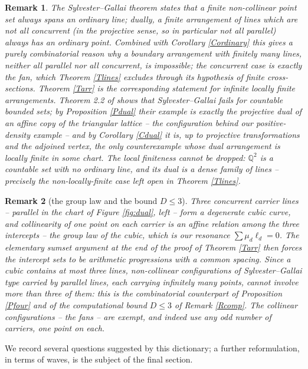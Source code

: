 \documentclass{article}
\newtheorem{remark}{Remark}
\begin{document}
	\begin{remark}
		The Sylvester--Gallai theorem states that a \emph{finite} non-collinear point set always spans an ordinary line; dually, a finite arrangement of lines which are not all concurrent (in the projective sense, so in particular not all parallel) always has an ordinary point. Combined with Corollary \ref{Cordinary} this gives a purely combinatorial reason why a boundary arrangement with finitely many lines, neither all parallel nor all concurrent, is impossible; the concurrent case is exactly the fan, which Theorem \ref{Tlines} excludes through its hypothesis of finite cross-sections. Theorem \ref{Tarr} is the corresponding statement for infinite locally finite arrangements. Theorem 2.2 of \cite{BDSYZ} shows that Sylvester--Gallai fails for countable \emph{bounded} sets; by Proposition \ref{Pdual} their example is exactly the projective dual of an affine copy of the triangular lattice -- the configuration behind our positive-density example -- and by Corollary \ref{Cdual} it is, up to projective transformations and the adjoined vertex, the only counterexample whose dual arrangement is locally finite in some chart. The local finiteness cannot be dropped: $\mathbb Q^2$ is a countable set with no ordinary line, and its dual is a dense family of lines -- precisely the non-locally-finite case left open in Theorem \ref{Tlines}.
	\end{remark}

	\begin{remark}[the group law and the bound $D\leq 3$]
		Three concurrent carrier lines -- parallel in the chart of Figure \ref{fig:dual}, left -- form a degenerate cubic curve, and collinearity of one point on each carrier is an affine relation among the three intercepts -- the group law of the cubic, which is our resonance $\sum\mu_d\ell_d=0$. The elementary sumset argument at the end of the proof of Theorem \ref{Tarr} then forces the intercept sets to be arithmetic progressions with a common spacing. Since a cubic contains at most three lines, non-collinear configurations of Sylvester--Gallai type carried by parallel lines, each carrying infinitely many points, cannot involve more than three of them: this is the combinatorial counterpart of Proposition \ref{Pfour} and of the computational bound $D\leq 3$ of Remark \ref{Rcomp}. The collinear configurations -- the fans -- are exempt, and indeed use any odd number of carriers, one point on each.
	\end{remark}

	We record several questions suggested by this dictionary; a further reformulation, in terms of waves, is the subject of the final section.
\end{document}
